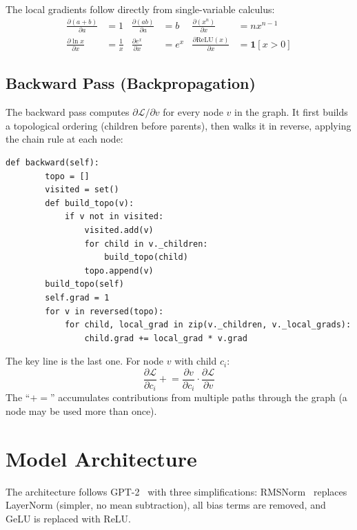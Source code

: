 \documentclass[11pt,a4paper]{article}
\begin{document}
The local gradients follow directly from single-variable calculus:
\begin{align}
\frac{\partial(a+b)}{\partial a} &= 1
& \frac{\partial(ab)}{\partial a} &= b
& \frac{\partial(x^n)}{\partial x} &= nx^{n-1} \\[4pt]
\frac{\partial \ln x}{\partial x} &= \frac{1}{x}
& \frac{\partial e^x}{\partial x} &= e^x
& \frac{\partial \text{ReLU}(x)}{\partial x} &= \mathbf{1}[x > 0]
\end{align}

\subsection{Backward Pass (Backpropagation)}

The backward pass computes $\partial\mathcal{L}/\partial v$ for every node $v$ in the graph. It first builds a topological ordering (children before parents), then walks it in reverse, applying the chain rule at each node:

\begin{lstlisting}[firstnumber=110]
    def backward(self):
        topo = []
        visited = set()
        def build_topo(v):
            if v not in visited:
                visited.add(v)
                for child in v._children:
                    build_topo(child)
                topo.append(v)
        build_topo(self)
        self.grad = 1
        for v in reversed(topo):
            for child, local_grad in zip(v._children, v._local_grads):
                child.grad += local_grad * v.grad
\end{lstlisting}

The key line is the last one. For node $v$ with child $c_i$:
\[
\frac{\partial \mathcal{L}}{\partial c_i} \mathrel{+}= \frac{\partial v}{\partial c_i} \cdot \frac{\partial \mathcal{L}}{\partial v}
\]
The ``$+=$'' accumulates contributions from multiple paths through the graph (a node may be used more than once).

\section{Model Architecture}

The architecture follows GPT-2~\cite{radford2019language} with three simplifications: RMSNorm~\cite{zhang2019root} replaces LayerNorm (simpler, no mean subtraction), all bias terms are removed, and GeLU is replaced with ReLU.
\end{document}
